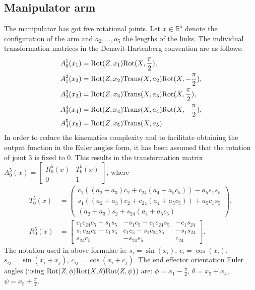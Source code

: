 \subsection{Manipulator arm}
\label{sec:manipul}
The manipulator has got five rotational joints.
Let $x\in \mathbb{R}^5$ denote the configuration of the arm and $a_2, \dots, a_5$ the lengths of the links. The individual transformation matrices in the Denavit-Hartenberg convention are as follows:
\begin{equation}
\begin{aligned}
A_0^1(x_1) &= \mathrm{Rot}(Z, x_1)\mathrm{Rot}(X, \frac{\pi}{2}),\\
A_1^2(x_2) &= \mathrm{Rot}(Z, x_2)\mathrm{Trans} (X, a_2)\mathrm{Rot}(X, -\frac{\pi}{2}),\\
A_2^3(x_3) &= \mathrm{Rot}(Z, x_3)\mathrm{Trans} (X, a_3)\mathrm{Rot}(X, \frac{\pi}{2}),\\
A_3^4(x_4) &= \mathrm{Rot}(Z, x_4)\mathrm{Trans} (X, a_4)\mathrm{Rot}(X, -\frac{\pi}{2}),\\
A_4^5(x_5) &= \mathrm{Rot}(Z, x_5)\mathrm{Trans} (X, a_5).
\end{aligned}
\end{equation}
In order to reduce the kinematics complexity and to facilitate obtaining the output function in the Euler angles form, it has been assumed that the rotation of joint 3 is fixed to $0$. This results in the transformation matrix $
A_0^5(x)=\begin{bmatrix}
R_0^5(x) & T_0^5(x)\\
0 & 1
\end{bmatrix}$, 
where
\begin{align}
T_0^5(x) &= \begin{pmatrix}
c_1\left((a_2+a_3)c_2 + c_{24}(a_4+a_5c_5)\right) - a_5s_1s_5\\
s_1\left((a_2+a_3)c_2 + c_{24}(a_4+a_5c_5)\right) + a_5c_1s_5\\
    (a_2+a_3)s_2 + s_{24}(a_4+a_5c_5)
\end{pmatrix},\\
R_0^5(x) &= \begin{bmatrix}
c_1c_{24}c_5-s_1s_5 & -s_1c_5-c_1c_{24}s_5 & -c_1s_{24}\\
s_1c_{24}c_5-c_1s_5 &  c_1c_5-s_1c_{24}s_5 & -s_1s_{24}\\
s_{24}c_5           & -s_{24}s_5           &  c_{24}
\end{bmatrix}.
\end{align}
The notation used in above formulae is: $s_i = \sin(x_i)$, $c_i=\cos(x_i)$, $s_{ij}=\sin(x_i+x_j)$,
$c_{ij}=\cos(x_i+c_j)$.
The end effector orientation Euler angles (using $\mathrm{Rot}(Z,\phi)\mathrm{Rot}(X, \theta)\mathrm{Rot}(Z, \psi)$) are: $\phi=x_1-\frac{\pi}{2}$, $\theta=x_2+x_4$, $\psi=x_5+\frac{\pi}{2}$.

